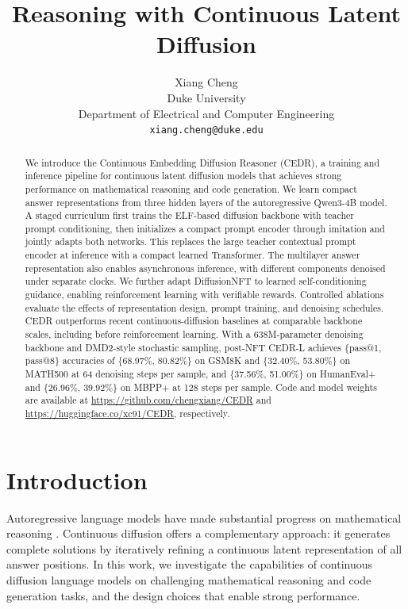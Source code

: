 \documentclass[11pt,letterpaper]{article}
\title{Reasoning with Continuous Latent Diffusion}
\author{Xiang Cheng\\
Duke University\\
Department of Electrical and Computer Engineering\\
\texttt{xiang.cheng@duke.edu}}
\date{}
\begin{document}
\maketitle

\begin{abstract}
We introduce the Continuous Embedding Diffusion Reasoner (CEDR), a training and inference pipeline for continuous latent diffusion models that achieves strong performance on mathematical reasoning and code generation. We learn compact answer representations from three hidden layers of the autoregressive Qwen3-4B model. A staged curriculum first trains the ELF-based diffusion backbone with teacher prompt conditioning, then initializes a compact prompt encoder through imitation and jointly adapts both networks. This replaces the large teacher contextual prompt encoder at inference with a compact learned Transformer. The multilayer answer representation also enables asynchronous inference, with different components denoised under separate clocks. We further adapt DiffusionNFT to learned self-conditioning guidance, enabling reinforcement learning with verifiable rewards. Controlled ablations evaluate the effects of representation design, prompt training, and denoising schedules. CEDR outperforms recent continuous-diffusion baselines at comparable backbone scales, including before reinforcement learning. With a 638M-parameter denoising backbone and DMD2-style stochastic sampling, post-NFT CEDR-L achieves \{pass@1, pass@8\} accuracies of \{68.97\%, 80.82\%\} on GSM8K and \{32.40\%, 53.80\%\} on MATH500 at 64 denoising steps per sample, and \{37.56\%, 51.00\%\} on HumanEval+ and \{26.96\%, 39.92\%\} on MBPP+ at 128 steps per sample.
Code and model weights are available at \url{https://github.com/chengxiang/CEDR} and \url{https://huggingface.co/xc91/CEDR}, respectively.
\end{abstract}

\section{Introduction}
\label{sec:introduction}

Autoregressive language models have made substantial progress on mathematical reasoning \citep{minerva,deepseekr1}. Continuous diffusion offers a complementary approach: it generates complete solutions by iteratively refining a continuous latent representation of all answer positions. In this work, we investigate the capabilities of continuous diffusion language models on challenging mathematical reasoning and code generation tasks, and the design choices that enable strong performance.
\end{document}
